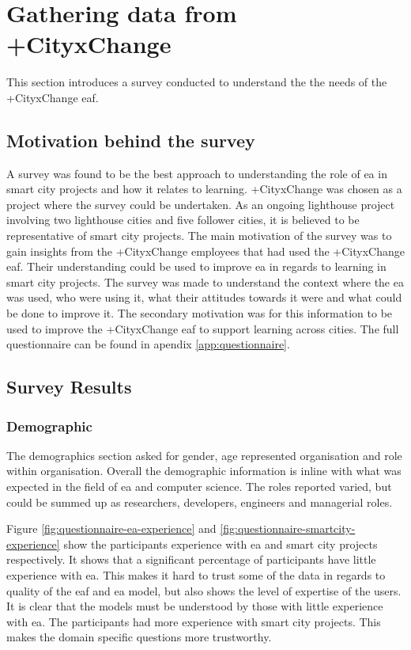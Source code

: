 \chapter{Gathering data from +CityxChange} 
\label{chap:survey}

This section introduces a survey conducted to understand the the needs of the +CityxChange \gls{eaf}.

\section{Motivation behind the survey}
A survey was found to be the best approach to understanding the role of \gls{ea} in smart city projects and how it relates to learning. +CityxChange was chosen as a project where the survey could be undertaken. As an ongoing lighthouse project involving two lighthouse cities and five follower cities, it is believed to be representative of smart city projects.
The main motivation of the survey was to gain insights from the +CityxChange employees that had used the +CityxChange \gls{eaf}. Their understanding could be used to improve \gls{ea} in regards to learning in smart city projects. The survey was made to understand the context where the \gls{ea} was used, who were using it, what their attitudes towards it were and what could be done to improve it. The secondary motivation was for this information to be used to improve the +CityxChange \gls{eaf} to support learning across cities.
The full questionnaire can be found in apendix \ref{app:questionnaire}.

\section{Survey Results}
\subsection{Demographic}
The demographics section asked for gender, age represented organisation and role within organisation.
Overall the demographic information is inline with what was expected in the field of \gls{ea} and computer science. 
The roles reported varied, but could be summed up as researchers, developers, engineers and managerial roles.




Figure \ref{fig:questionnaire-ea-experience} and \ref{fig:questionnaire-smartcity-experience} show the participants experience with \gls{ea} and smart city projects respectively. It shows that a significant percentage of participants have little experience with \gls{ea}. This makes it hard to trust some of the data in regards to quality of the \gls{eaf} and \gls{ea} model, but also shows the level of expertise of the users. It is clear that the models must be understood by those with little experience with \gls{ea}. The participants had more experience with smart city projects. This makes the domain specific questions more trustworthy. 

